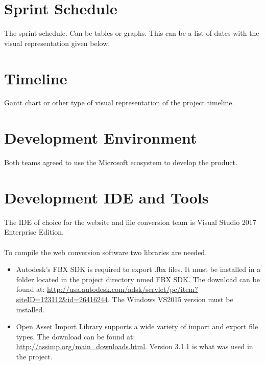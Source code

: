 \section{Sprint Schedule}
The sprint schedule.  Can be tables or graphs.   This can be a list of dates with the visual 
representation given below.

\section{Timeline}
Gantt chart or other type of visual representation of the project timeline.

\section{Development Environment}
Both teams agreed to use the Microsoft ecosystem to develop the product.

\section{Development IDE and Tools}

The IDE of choice for the website and file conversion team is Visual Studio 2017 Enterprise Edition.

\paragraph{}
To compile the web conversion software two libraries are needed.
\begin{itemize}
    \item Autodesk's FBX SDK is required to export .fbx files.  It must be installed in a folder located in the project directory nmed \"FBX SDK\".  The download can be found at: 
    \url{http://usa.autodesk.com/adsk/servlet/pc/item?siteID=123112&id=26416244}.
    The Windows VS2015 version must be installed.
    
    \item Open Asset Import Library supports a wide variety of import and export file types.  The download can be found at: \url{http://assimp.org/main_downloads.html}.  Version 3.1.1 is what was used in the project. 
\end{itemize}

